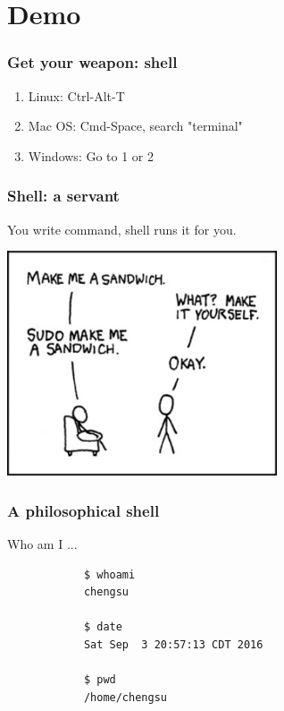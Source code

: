 \documentclass{beamer}
\begin{document}
	\section{Demo}

	\begin{frame}
		\frametitle{Get your weapon: shell}
		\begin{enumerate}
			\item Linux: Ctrl-Alt-T
			\item Mac OS: Cmd-Space, search "terminal"
			\item Windows: Go to 1 or 2
		\end{enumerate}
	\end{frame}

	\begin{frame}
		\frametitle{Shell: a servant}
		You write command, shell runs it for you.
		\begin{center}
		\includegraphics[width=0.6\textwidth, height=0.6\textheight]{img/sudo.jpg}
		\end{center}
	\end{frame}

	\begin{frame}[fragile]
		\frametitle{A philosophical shell}
		Who am I ...
		\begin{center}
		\begin{verbatim}
			$ whoami
			chengsu

			$ date
			Sat Sep  3 20:57:13 CDT 2016

			$ pwd
			/home/chengsu 
		\end{verbatim}
		\end{center}	
	\end{frame}
\end{document}
